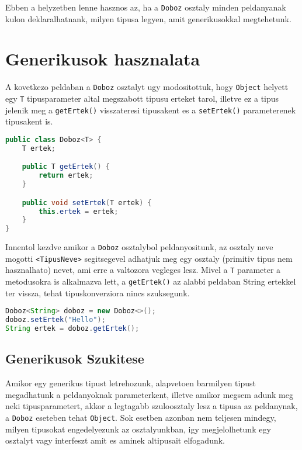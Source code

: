 \documentclass{article}
\let\l\lstinline
\begin{document}
Ebben a helyzetben lenne hasznos az, ha a \l{Doboz} osztaly minden peldanyanak kulon deklaralhatnank, milyen tipusa legyen, amit generikusokkal megtehetunk.

\newpage

\section{Generikusok hasznalata}

A kovetkezo peldaban a \l{Doboz} osztalyt ugy modositottuk, hogy \l{Object} helyett egy \l{T} tipusparameter altal megszabott tipusu erteket tarol, illetve ez a tipus jelenik meg a \l{getErtek()} visszateresi tipusakent es a \l{setErtek()} parameterenek tipusakent is.

\begin{lstlisting}[language=Java, caption=Generikus Doboz osztaly]
public class Doboz<T> {
	T ertek;

	public T getErtek() {
		return ertek;
	}

	public void setErtek(T ertek) {
		this.ertek = ertek;
	}
}
\end{lstlisting}

Innentol kezdve amikor a \l{Doboz} osztalybol peldanyositunk, az osztaly neve mogotti \l{<TipusNeve>} segitsegevel adhatjuk meg egy osztaly (primitiv tipus nem hasznalhato) nevet, ami erre a valtozora vegleges lesz. Mivel a \l{T} parameter a metodusokra is alkalmazva lett, a \l{getErtek()} az alabbi peldaban String ertekkel ter vissza, tehat tipuskonverziora nincs szuksegunk.

\begin{lstlisting}[language=Java, caption=Generikus Doboz hasznalata String-gel]
Doboz<String> doboz = new Doboz<>();
doboz.setErtek("Hello");
String ertek = doboz.getErtek();
\end{lstlisting}

\newpage

\subsection{Generikusok Szukitese}

Amikor egy generikus tipust letrehozunk, alapvetoen barmilyen tipust megadhatunk a peldanyoknak parameterkent, illetve amikor megsem adunk meg neki tipusparametert, akkor a legtagabb szuloosztaly lesz a tipusa az peldanynak, a \l{Doboz} eseteben tehat \l{Object}. Sok esetben azonban nem teljesen mindegy, milyen tipusokat engedelyezunk az osztalyunkban, igy megjelolhetunk egy osztalyt vagy interfeszt amit es aminek altipusait elfogadunk.
\end{document}
